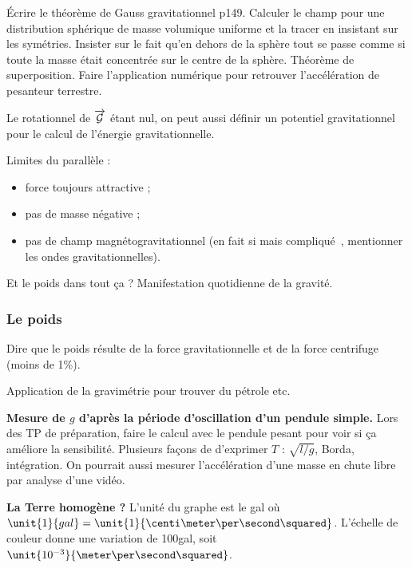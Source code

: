 Écrire le théorème de Gauss gravitationnel \cite{Faroux1996} p149.
Calculer le champ pour une distribution sphérique de masse volumique uniforme et la tracer en insistant sur les symétries.
Insister sur le fait qu'en dehors de la sphère tout se passe comme si toute la masse était concentrée sur le centre de la sphère.
Théorème de superposition.
Faire l'application numérique pour retrouver l'accélération de pesanteur terrestre.
\begin{remarque}
Le rotationnel de $\overrightarrow{\cal{G}}$ étant nul, on peut aussi définir un potentiel gravitationnel pour le calcul de l'énergie gravitationnelle.
\end{remarque}

Limites du parallèle :
\begin{itemize}
\item force toujours attractive ;
\item pas de masse négative ;
\item pas de champ magnétogravitationnel (en fait si mais compliqué~\cite{Mashhoon2007}, mentionner les ondes gravitationnelles).
\end{itemize}

\begin{transition}
Et le poids dans tout ça ?
Manifestation quotidienne de la gravité.
\end{transition}

\subsubsection{Le poids}

Dire que le poids résulte de la force gravitationnelle et de la force centrifuge (moins de 1\%).

Application de la gravimétrie pour trouver du pétrole etc.

\begin{experience}
\textbf{Mesure de $g$ d'après la période d'oscillation d'un pendule simple.}
Lors des TP de préparation, faire le calcul avec le pendule pesant pour voir si ça améliore la sensibilité.
Plusieurs façons de d'exprimer $T$ : $\sqrt{l/g}$, Borda, intégration.
On pourrait aussi mesurer l'accélération d'une masse en chute libre par analyse d'une vidéo.
\end{experience}

\begin{slide}
\textbf{La Terre homogène ?}
L'unité du graphe est le gal où $\unit{1}{gal} = \unit{1}{\centi\meter\per\second\squared}$.
L'échelle de couleur donne une variation de \unit{100}{\milli gal}, soit $\unit{10^{-3}}{\meter\per\second\squared}$.
\end{slide}

